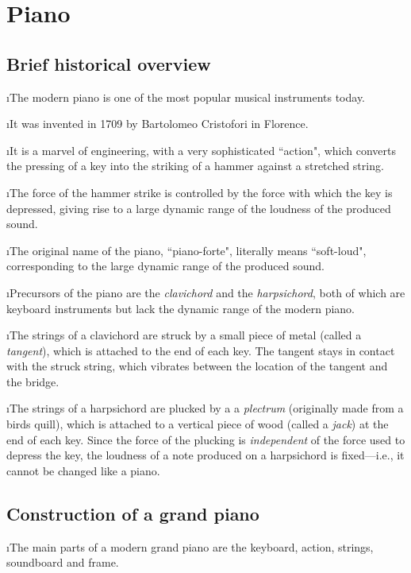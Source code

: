 \section{Piano}

\subsection{Brief historical overview}
\bi

\i The modern piano is one of the most popular musical
instruments today.

\i It was invented in 1709 by Bartolomeo Cristofori
in Florence.

\i It is a marvel of engineering, with a very 
sophisticated ``action", which converts the pressing 
of a key into the striking of a hammer against a 
stretched string.

\i The force of the hammer strike is controlled by 
the force with which the key is depressed, 
giving rise to a large dynamic range of the loudness
of the produced sound.

\i The original name of the piano, ``piano-forte", 
literally means ``soft-loud", corresponding to the 
large dynamic range of the produced sound.

\i Precursors of the piano are the {\em clavichord} and 
the {\em harpsichord}, both of which are keyboard
instruments but lack the dynamic range of the modern piano.

\i The strings of a clavichord are struck by a small 
piece of metal (called a {\em tangent}), which is attached 
to the end of each key.
The tangent stays in contact with the struck string,
which vibrates between the location of the tangent and 
the bridge.

\i The strings of a harpsichord are plucked by a
a {\em plectrum} (originally made from a birds quill),
which is attached to a vertical piece of wood 
(called a {\em jack}) at the end of each key.
Since the force of the plucking is {\em independent} 
of the force used to depress the key, the loudness
of a note produced on a harpsichord is fixed---i.e.,
it cannot be changed like a piano.

\ei
\subsection{Construction of a grand piano}
\bi

\i The main parts of a modern grand piano are the
keyboard, action, strings, soundboard and frame.

